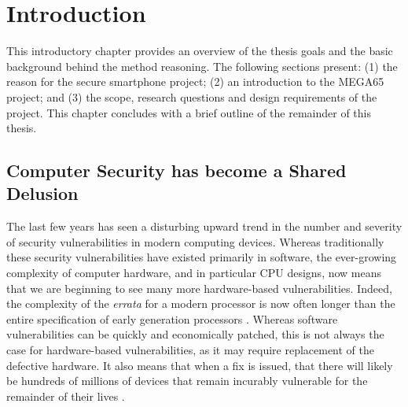 
\chapter{Introduction} %

\label{Chapter1} %


This introductory chapter provides an overview of the thesis goals and the basic background behind the method reasoning. The following sections present: (1) the reason for the secure smartphone project; (2) an introduction to the MEGA65 project; and (3) the scope, research questions and design requirements of the project. This chapter concludes with a brief outline of the remainder of this thesis.

\section{Computer Security has become a Shared Delusion}

The last few years has seen a disturbing upward trend in the number and severity of security vulnerabilities in modern computing devices.
Whereas traditionally these security vulnerabilities have existed primarily in software, the ever-growing complexity of computer hardware, and in particular CPU designs, now means that we are beginning to see many more hardware-based vulnerabilities.
Indeed, the complexity of the {\em errata} for a modern processor is now often longer\cite{6thGener70:online} than the entire specification of early generation processors \cite{mos6500m32:online}.
Whereas software vulnerabilities can be quickly and economically patched, this is not always the case for hardware-based vulnerabilities, as it may require replacement of the defective hardware.  It also means that when a fix is issued, that there will likely be hundreds of millions of devices that remain incurably vulnerable for the remainder of their lives .

